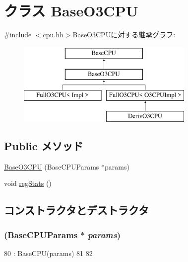 \hypertarget{classBaseO3CPU}{
\section{クラス BaseO3CPU}
\label{classBaseO3CPU}
}


{\ttfamily \#include $<$cpu.hh$>$}BaseO3CPUに対する継承グラフ:\begin{figure}[H]
\begin{center}
\leavevmode
\includegraphics[height=4cm]{classBaseO3CPU}
\end{center}
\end{figure}
\subsection*{Public メソッド}
\begin{DoxyCompactItemize}
\item 
\hyperlink{classBaseO3CPU_a35c252bd3c7d14915d4e91e8bd757e0b}{BaseO3CPU} (BaseCPUParams $\ast$params)
\item 
void \hyperlink{classBaseO3CPU_a4dc637449366fcdfc4e764cdf12d9b11}{regStats} ()
\end{DoxyCompactItemize}


\subsection{コンストラクタとデストラクタ}
\hypertarget{classBaseO3CPU_a35c252bd3c7d14915d4e91e8bd757e0b}{
\subsubsection[{BaseO3CPU}]{ (BaseCPUParams $\ast$ {\em params})}}
\label{classBaseO3CPU_a35c252bd3c7d14915d4e91e8bd757e0b}



\begin{DoxyCode}
80     : BaseCPU(params)
81 {
82 }
\end{DoxyCode}


